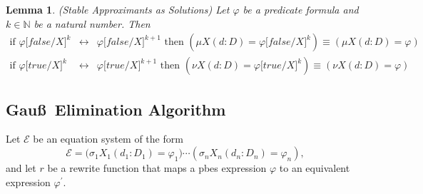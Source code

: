 \documentclass{article}
\newtheorem{lemma}[theorem]{Lemma}
\begin{document}
\begin{lemma}
(Stable Approximants as Solutions) Let $\varphi $ be a predicate formula and 
$k\in \mathbb{N}$ be a natural number. Then%
\begin{eqnarray*}
\text{if }\varphi \lbrack false/X]^{k} &\longleftrightarrow &\varphi \lbrack
false/X]^{k+1}\text{ then }(\mu X(d:D)=\varphi \lbrack false/X]^{k})\equiv
(\mu X(d:D)=\varphi ) \\
\text{if }\varphi \lbrack true/X]^{k} &\longleftrightarrow &\varphi \lbrack
true/X]^{k+1}\text{ then }(\nu X(d:D)=\varphi \lbrack true/X]^{k})\equiv
(\nu X(d:D)=\varphi )
\end{eqnarray*}
\end{lemma}

\subsection{Gau\ss\ Elimination Algorithm}

Let $\mathcal{E}$ be an equation system of the form%
\begin{equation*}
\mathcal{E=(}\sigma _{1}X_{1}(d_{1}:D_{1})=\varphi _{1})\cdots (\sigma
_{n}X_{n}(d_{n}:D_{n})=\varphi _{n}),
\end{equation*}%
and let $r$ be a rewrite function that maps a pbes expression $\varphi $ to
an equivalent expression $\varphi ^{\prime }$.
\end{document}
